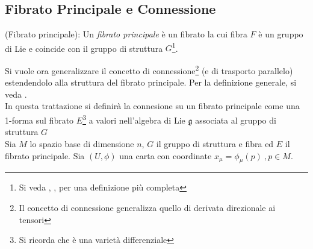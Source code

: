 \subsection{Fibrato Principale e Connessione}
\begin{definition}{(Fibrato principale)}:
   Un \emph{fibrato principale} è un fibrato la cui fibra $F$ è un gruppo di Lie
   e coincide con il gruppo di struttura $G$\footnote{Si veda \cite{nakahara},
   \cite{shnir}, \cite{eguchi} per una definizione più completa}.
\end{definition}

Si vuole ora generalizzare il concetto di connessione\footnote{Il concetto di
connessione generalizza quello di derivata direzionale ai tensori}
(e di trasporto parallelo) estendendolo alla struttura del fibrato principale.
Per la definizione generale, si veda \cite{nakahara}. \\
In questa trattazione si definirà la connesione su un fibrato principale come
una 1-forma sul fibrato $E$\footnote{Si ricorda che è una varietà differenziale}
a valori nell'algebra di Lie $\mathfrak{g}$ associata al gruppo di struttura $G$ \\

Sia $M$ lo spazio base di dimensione $n$, $G$ il gruppo di struttura e fibra ed
$E$ il fibrato principale. Sia $(U,\phi)$ una carta con coordinate
$x_\mu = \phi_\mu(p) \:,p \in M$.
